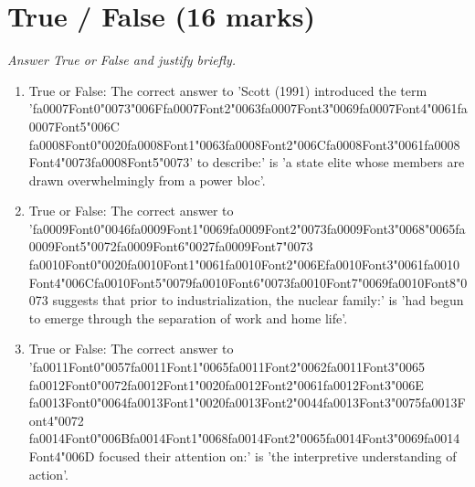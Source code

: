 \documentclass[12pt]{article}
\begin{document}
\section*{True / False (16 marks)}
\textit{Answer True or False and justify briefly.}
\begin{enumerate}[label=\arabic*.]
\item True or False: The correct answer to 'Scott (1991) introduced the term '{\csname fa0007Font0\endcsname\char"0073}{\char"006F}{\csname fa0007Font2\endcsname\char"0063}{\csname fa0007Font3\endcsname\char"0069}{\csname fa0007Font4\endcsname\char"0061}{\csname fa0007Font5\endcsname\char"006C} {\csname fa0008Font0\endcsname\char"0020}{\csname fa0008Font1\endcsname\char"0063}{\csname fa0008Font2\endcsname\char"006C}{\csname fa0008Font3\endcsname\char"0061}{\csname fa0008Font4\endcsname\char"0073}{\csname fa0008Font5\endcsname\char"0073}' to describe:' is 'a state elite whose members are drawn overwhelmingly from a power bloc'.
\item True or False: The correct answer to '{\csname fa0009Font0\endcsname\char"0046}{\csname fa0009Font1\endcsname\char"0069}{\csname fa0009Font2\endcsname\char"0073}{\csname fa0009Font3\endcsname\char"0068}{\char"0065}{\csname fa0009Font5\endcsname\char"0072}{\csname fa0009Font6\endcsname\char"0027}{\csname fa0009Font7\endcsname\char"0073} {\csname fa0010Font0\endcsname\char"0020}{\csname fa0010Font1\endcsname\char"0061}{\csname fa0010Font2\endcsname\char"006E}{\csname fa0010Font3\endcsname\char"0061}{\csname fa0010Font4\endcsname\char"006C}{\csname fa0010Font5\endcsname\char"0079}{\csname fa0010Font6\endcsname\char"0073}{\csname fa0010Font7\endcsname\char"0069}{\csname fa0010Font8\endcsname\char"0073} suggests that prior to industrialization, the nuclear family:' is 'had begun to emerge through the separation of work and home life'.
\item True or False: The correct answer to '{\csname fa0011Font0\endcsname\char"0057}{\csname fa0011Font1\endcsname\char"0065}{\csname fa0011Font2\endcsname\char"0062}{\csname fa0011Font3\endcsname\char"0065} {\csname fa0012Font0\endcsname\char"0072}{\csname fa0012Font1\endcsname\char"0020}{\csname fa0012Font2\endcsname\char"0061}{\csname fa0012Font3\endcsname\char"006E} {\csname fa0013Font0\endcsname\char"0064}{\csname fa0013Font1\endcsname\char"0020}{\csname fa0013Font2\endcsname\char"0044}{\csname fa0013Font3\endcsname\char"0075}{\csname fa0013Font4\endcsname\char"0072} {\csname fa0014Font0\endcsname\char"006B}{\csname fa0014Font1\endcsname\char"0068}{\csname fa0014Font2\endcsname\char"0065}{\csname fa0014Font3\endcsname\char"0069}{\csname fa0014Font4\endcsname\char"006D} focused their attention on:' is 'the interpretive understanding of action'.

\end{enumerate}
\end{document}
